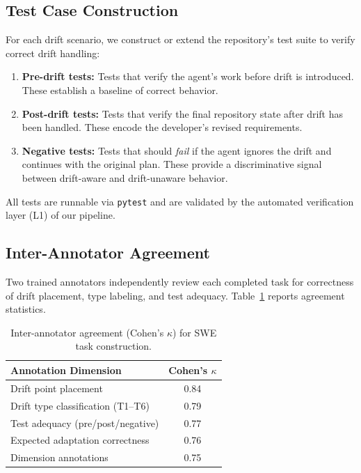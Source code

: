 \subsection{Test Case Construction}

For each drift scenario, we construct or extend the repository's test suite to verify correct drift handling:

\begin{enumerate}[leftmargin=*, itemsep=2pt]
    \item \textbf{Pre-drift tests:} Tests that verify the agent's work before drift is introduced. These establish a baseline of correct behavior.
    \item \textbf{Post-drift tests:} Tests that verify the final repository state after drift has been handled. These encode the developer's revised requirements.
    \item \textbf{Negative tests:} Tests that should \emph{fail} if the agent ignores the drift and continues with the original plan. These provide a discriminative signal between drift-aware and drift-unaware behavior.
\end{enumerate}

\noindent All tests are runnable via \texttt{pytest} and are validated by the automated verification layer (L1) of our pipeline.

\subsection{Inter-Annotator Agreement}

Two trained annotators independently review each completed task for correctness of drift placement, type labeling, and test adequacy. Table~\ref{tab:iaa-swe} reports agreement statistics.

\begin{table}[h]
\centering
\small
\caption{Inter-annotator agreement (Cohen's $\kappa$) for SWE task construction.}
\label{tab:iaa-swe}
\begin{tabular}{lc}
\toprule
\textbf{Annotation Dimension} & \textbf{Cohen's $\kappa$} \\
\midrule
Drift point placement & 0.84 \\
Drift type classification (T1--T6) & 0.79 \\
Test adequacy (pre/post/negative) & 0.77 \\
Expected adaptation correctness & 0.76 \\
Dimension annotations & 0.75 \\
\bottomrule
\end{tabular}
\end{table}

